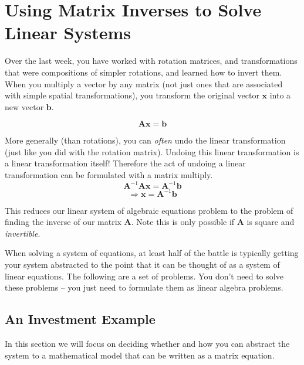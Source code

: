 \section{Using Matrix Inverses to Solve Linear Systems}
Over the last week, you have worked with rotation matrices, and transformations that were compositions of simpler rotations, and learned how to invert them. When you multiply a vector by any matrix (not just ones that are associated with simple spatial transformations), you transform the original vector $ \mathbf{x} $ into a new vector $ \mathbf{b} $.

\[ \mathbf{A} \mathbf{x} = \mathbf{b} \]

More generally (than rotations), you can \emph{often} undo the linear transformation (just like you did with the rotation matrix). Undoing this linear transformation is a linear transformation itself! Therefore the act of undoing a linear transformation can be formulated with a matrix multiply.\\

\[ \mathbf{A}^{-1} \mathbf{A} \mathbf{x} = \mathbf{A}^{-1}\mathbf{b} \]
\[\Rightarrow \mathbf{x} = \mathbf{A}^{-1}\mathbf{b} \]

This reduces our linear system of algebraic equations problem to the problem of finding the inverse of our matrix $ \mathbf{A}$.  Note this is only possible if $\mathbf{A}$ is square and \emph{invertible}.


When solving a system of equations, at least half of the battle is typically getting your system abstracted to the point that it can be thought of as a system of linear equations. The following are a set of problems.  You don't need to solve these problems -- you just need to formulate them as linear algebra problems.




\subsection{An Investment Example}
In this section we will focus on deciding whether and how you can abstract the system to a mathematical model that can be written as a matrix equation.

